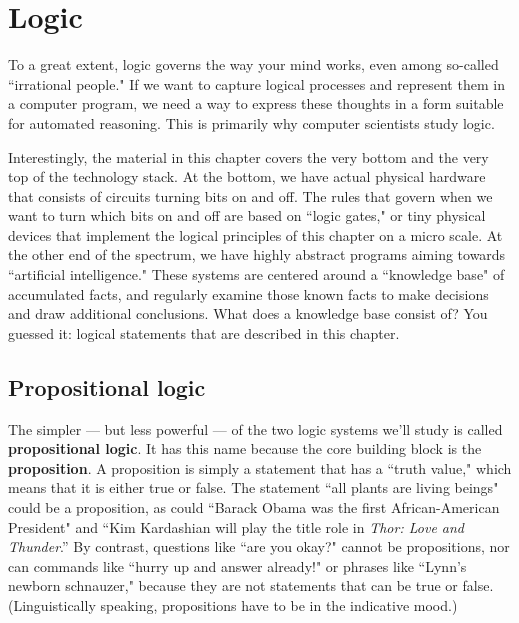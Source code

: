 

\chapter{Logic}

To a great extent, logic governs the way your mind works, even among
so-called ``irrational people." If we want to capture logical processes and
represent them in a computer program, we need a way to express these
thoughts in a form suitable for automated reasoning. This is primarily why
computer scientists study logic.

Interestingly, the material in this chapter covers the very bottom and the
very top of the technology stack. At the bottom, we have actual physical
hardware that consists of circuits turning bits on and off. The rules that
govern when we want to turn which bits on and off are based on ``logic
gates," or tiny physical devices that implement the logical principles of
this chapter on a micro scale. At the other end of the spectrum, we have
highly abstract programs aiming towards ``artificial intelligence." These
systems are centered around a ``knowledge base" of accumulated facts, and
regularly examine those known facts to make decisions and draw additional
conclusions. What does a knowledge base consist of? You guessed it: logical
statements that are described in this chapter.

\section{Propositional logic} 

The simpler --- but less powerful --- of the two logic systems we'll study is
called \textbf{propositional logic}. It has this name because the core building
block is the \textbf{proposition}. A proposition is simply a statement that has
a ``truth value," which means that it is either true or false. The statement
``all plants are living beings" could be a proposition, as could ``Barack Obama
was the first African-American President" and ``Kim Kardashian will play the
title role in \textit{Thor: Love and Thunder}.'' By contrast, questions like
``are you okay?" cannot be propositions, nor can commands like ``hurry up and
answer already!" or phrases like ``Lynn's newborn schnauzer," because they are
not statements that can be true or false. (Linguistically speaking,
propositions have to be in the indicative mood.)

